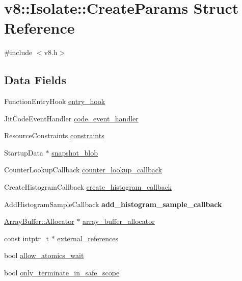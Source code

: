 \hypertarget{structv8_1_1Isolate_1_1CreateParams}{}\section{v8\+:\+:Isolate\+:\+:Create\+Params Struct Reference}
\label{structv8_1_1Isolate_1_1CreateParams}


{\ttfamily \#include $<$v8.\+h$>$}

\subsection*{Data Fields}
\begin{DoxyCompactItemize}
\item 
Function\+Entry\+Hook \mbox{\hyperlink{structv8_1_1Isolate_1_1CreateParams_aa7aa18bbe2d86713e5b074a93b38dc60}{entry\+\_\+hook}}
\item 
Jit\+Code\+Event\+Handler \mbox{\hyperlink{structv8_1_1Isolate_1_1CreateParams_a783e3eba90ce6e2800bdd69197bbccdd}{code\+\_\+event\+\_\+handler}}
\item 
Resource\+Constraints \mbox{\hyperlink{structv8_1_1Isolate_1_1CreateParams_a2c570b306aa8c1c24cfe70e8eee50fa1}{constraints}}
\item 
Startup\+Data $\ast$ \mbox{\hyperlink{structv8_1_1Isolate_1_1CreateParams_a25d38476e4dec79ae96c59292eee4a64}{snapshot\+\_\+blob}}
\item 
Counter\+Lookup\+Callback \mbox{\hyperlink{structv8_1_1Isolate_1_1CreateParams_a10441abadd0b83a938303c92e7444fb6}{counter\+\_\+lookup\+\_\+callback}}
\item 
Create\+Histogram\+Callback \mbox{\hyperlink{structv8_1_1Isolate_1_1CreateParams_a11acf5fb9cdbc4c8bf15baf542507b49}{create\+\_\+histogram\+\_\+callback}}
\item 
\mbox{\label{structv8_1_1Isolate_1_1CreateParams_a3e0fb886996eb1f498b6cc157e11e280}} 
Add\+Histogram\+Sample\+Callback {\bfseries add\+\_\+histogram\+\_\+sample\+\_\+callback}
\item 
\mbox{\hyperlink{classv8_1_1ArrayBuffer_1_1Allocator}{Array\+Buffer\+::\+Allocator}} $\ast$ \mbox{\hyperlink{structv8_1_1Isolate_1_1CreateParams_a7c663f70b64290392eeaf164f57585f9}{array\+\_\+buffer\+\_\+allocator}}
\item 
const intptr\+\_\+t $\ast$ \mbox{\hyperlink{structv8_1_1Isolate_1_1CreateParams_a89b8c9dc74efbdcd93ab5786eae6fe19}{external\+\_\+references}}
\item 
bool \mbox{\hyperlink{structv8_1_1Isolate_1_1CreateParams_acade19de0f78ff15d76aaef2e292da72}{allow\+\_\+atomics\+\_\+wait}}
\item 
bool \mbox{\hyperlink{structv8_1_1Isolate_1_1CreateParams_af44a854a07944452589128b6cf3b9958}{only\+\_\+terminate\+\_\+in\+\_\+safe\+\_\+scope}}
\end{DoxyCompactItemize}


